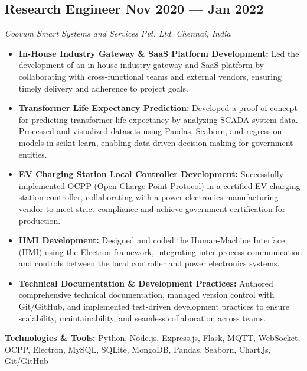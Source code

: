 \documentclass[a4paper,10pt]{article}
\newenvironment{zitemize}{
  \begin{itemize} 
    \itemsep 0pt 
    \parskip 0pt 
    \parsep 1pt
    \topsep 0pt 
    \partopsep 0pt
    \sloppy
}{
  \end{itemize}
  \vspace{0.5em} %
}
\begin{document}
\subsection*{Research Engineer \hfill Nov 2020 --- Jan 2022}
\textit{Coovum Smart Systems and Services Pvt. Ltd. \hfill Chennai, India}
\begin{zitemize}
    \item \textbf{In-House Industry Gateway \& SaaS Platform Development:} Led the development of an in-house industry gateway and SaaS platform by collaborating with cross-functional teams and external vendors, ensuring timely delivery and adherence to project goals.
    \item \textbf{Transformer Life Expectancy Prediction:} Developed a proof-of-concept for predicting transformer life expectancy by analyzing SCADA system data. Processed and visualized datasets using Pandas, Seaborn, and regression models in scikit-learn, enabling data-driven decision-making for government entities.
    \item \textbf{EV Charging Station Local Controller Development:} Successfully implemented OCPP (Open Charge Point Protocol) in a certified EV charging station controller, collaborating with a power electronics manufacturing vendor to meet strict compliance and achieve government certification for production.
    \item \textbf{HMI Development:} Designed and coded the Human-Machine Interface (HMI) using the Electron framework, integrating inter-process communication and controls between the local controller and power electronics systems.
    \item \textbf{Technical Documentation \& Development Practices:} Authored comprehensive technical documentation, managed version control with Git/GitHub, and implemented test-driven development practices to ensure scalability, maintainability, and seamless collaboration across teams.
\end{zitemize}
\textbf{Technologies \& Tools:} Python, Node.js, Express.js, Flask, MQTT, WebSocket, OCPP, Electron, MySQL, SQLite, MongoDB, Pandas, Seaborn, Chart.js, Git/GitHub

\vspace{6pt}
\end{document}
